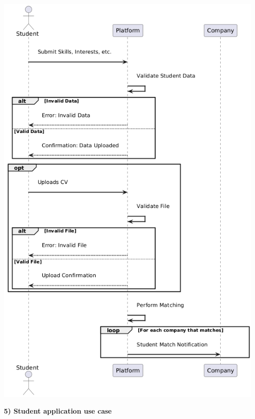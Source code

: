 \begin{center}
    \includegraphics[scale = 0.8]{Images/ImagesRASD/Personal_data_and_CV_upload.png}
\end{center}

\newpage
\textbf{5) Student application use case}\\

